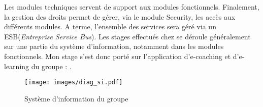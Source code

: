 Les modules techniques servent de support aux modules fonctionnels.
Finalement, la gestion des droits permet de gérer, via le module Security, les accès aux différents modules.
A terme, l'ensemble des services sera géré via un ESB(\textit{Entreprise Service Bus}).
Les stages effectués chez \ebi{} se déroule généralement sur une partie du système d'information, notamment dans les modules fonctionnels.
Mon stage s'est donc porté sur l'application d'e-coaching et d'e-learning du groupe : \capico{}.

\begin{figure}[H]
	\centering
	\texttt{[image: images/diag\_si.pdf]}
	\caption{Système d'information du groupe \excilys{}}
\end{figure}
